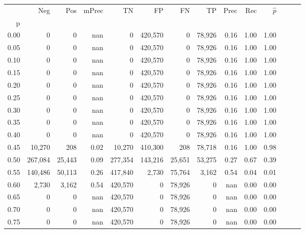 \begin{tabular}{rrrrrrrrrrrrrr}
\toprule
{} &      Neg &     Pos & mPrec &       TN &       FP &      FN &      TP &  Prec &   Rec & $\hat{p}$ \\
p    &          &         &       &          &          &         &         &       &       &           \\
\midrule
0.00 &        0 &       0 &   nan &        0 &  420,570 &       0 &  78,926 &  0.16 &  1.00 &      1.00 \\
0.05 &        0 &       0 &   nan &        0 &  420,570 &       0 &  78,926 &  0.16 &  1.00 &      1.00 \\
0.10 &        0 &       0 &   nan &        0 &  420,570 &       0 &  78,926 &  0.16 &  1.00 &      1.00 \\
0.15 &        0 &       0 &   nan &        0 &  420,570 &       0 &  78,926 &  0.16 &  1.00 &      1.00 \\
0.20 &        0 &       0 &   nan &        0 &  420,570 &       0 &  78,926 &  0.16 &  1.00 &      1.00 \\
0.25 &        0 &       0 &   nan &        0 &  420,570 &       0 &  78,926 &  0.16 &  1.00 &      1.00 \\
0.30 &        0 &       0 &   nan &        0 &  420,570 &       0 &  78,926 &  0.16 &  1.00 &      1.00 \\
0.35 &        0 &       0 &   nan &        0 &  420,570 &       0 &  78,926 &  0.16 &  1.00 &      1.00 \\
0.40 &        0 &       0 &   nan &        0 &  420,570 &       0 &  78,926 &  0.16 &  1.00 &      1.00 \\
0.45 &   10,270 &     208 &  0.02 &   10,270 &  410,300 &     208 &  78,718 &  0.16 &  1.00 &      0.98 \\
0.50 &  267,084 &  25,443 &  0.09 &  277,354 &  143,216 &  25,651 &  53,275 &  0.27 &  0.67 &      0.39 \\
0.55 &  140,486 &  50,113 &  0.26 &  417,840 &    2,730 &  75,764 &   3,162 &  0.54 &  0.04 &      0.01 \\
0.60 &    2,730 &   3,162 &  0.54 &  420,570 &        0 &  78,926 &       0 &   nan &  0.00 &      0.00 \\
0.65 &        0 &       0 &   nan &  420,570 &        0 &  78,926 &       0 &   nan &  0.00 &      0.00 \\
0.70 &        0 &       0 &   nan &  420,570 &        0 &  78,926 &       0 &   nan &  0.00 &      0.00 \\
0.75 &        0 &       0 &   nan &  420,570 &        0 &  78,926 &       0 &   nan &  0.00 &      0.00 \\

\end{tabular}
